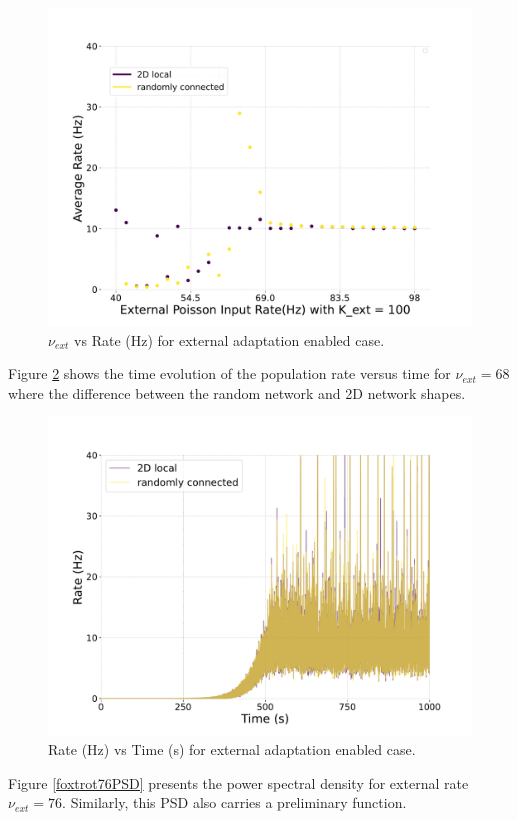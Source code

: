\documentclass[a4paper,12pt]{article}
\begin{document}
\begin{figure}[H] 
    \centering
    \includegraphics[width=0.8\linewidth]{nuext_vs_activity_foxtrot_legended.pdf}
    \caption{$\nu_{ext}$ vs Rate (Hz) for external adaptation enabled case.}
    \label{foxtrot}
\end{figure}
Figure \ref{foxtrot_rate} shows the time evolution of the population rate versus time for $\nu_{ext}=68$ where the difference between the random network and 2D network shapes. 
\begin{figure}[H] 
    \centering
    \includegraphics[width=0.8\linewidth]{nu_ext_68rate_over_time_homeostasis_foxtrot.pdf}
    \caption{ Rate (Hz) vs Time (s) for external adaptation enabled case.}
    \label{foxtrot_rate}
\end{figure}
Figure \ref{foxtrot76PSD} presents the power spectral density for external rate $\nu_{ext} = 76$. Similarly, this PSD also carries a preliminary function.
\end{document}
